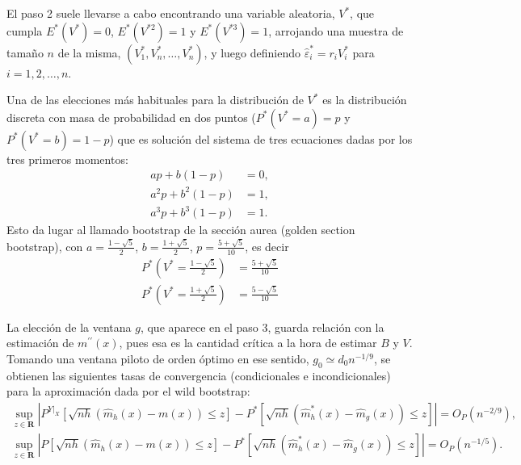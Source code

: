 \documentclass[
]{book}
\theoremstyle{break}
\theoremstyle{definition}
\theoremstyle{definition}
\theoremstyle{definition}
\theoremstyle{remark}
\begin{document}
El paso 2 suele llevarse a cabo encontrando una variable aleatoria,
\(V^{\ast}\), que cumpla \(E^{\ast}\left( V^{\ast} \right) =0\), \(E^{\ast}\left( V^{\ast 2} \right) =1\) y \(E^{\ast}\left( V^{\ast 3} \right) =1\),
arrojando una muestra de tamaño \(n\) de la misma,
\(\left( V_1^{\ast},V_n^{\ast},\ldots ,V_n^{\ast} \right)\), y luego
definiendo \(\hat{\varepsilon}_i^{\ast} = r_iV_i^{\ast}\)
para \(i=1, 2, \ldots, n\).

Una de las elecciones más habituales para la distribución de
\(V^{\ast}\) es la distribución discreta con masa de probabilidad en dos
puntos (\(P^{\ast}\left( V^{\ast}=a \right) =p\) y
\(P^{\ast}\left( V^{\ast}=b \right) =1-p\)) que es solución del sistema
de tres ecuaciones dadas por los tres primeros momentos:
\[\begin{aligned}
ap+b\left( 1-p \right) &= 0, \\
a^2p+b^2\left( 1-p \right) &= 1, \\
a^{3}p+b^{3}\left( 1-p \right) &= 1.
\end{aligned}\]
Esto da lugar al llamado bootstrap de la sección aurea
(golden section bootstrap), con
\(a=\frac{1-\sqrt{5}}{2}\), \(b=\frac{1+\sqrt{5}}{2}\), \(p=\frac{ 5+\sqrt{5}}{10}\), es decir
\[\begin{aligned}
P^{\ast}\left( V^{\ast}=\frac{1-\sqrt{5}}{2} \right) &= \frac{5+\sqrt{5}}{10} \\
P^{\ast}\left( V^{\ast}=\frac{1+\sqrt{5}}{2} \right) &= \frac{5-\sqrt{5}}{10}
\end{aligned}\]

La elección de la ventana \(g\), que aparece en el paso 3, guarda relación
con la estimación de \(m^{\prime \prime }\left( x \right)\), pues esa es
la cantidad crítica a la hora de estimar \(B\) y \(V\). Tomando una ventana
piloto de orden óptimo en ese sentido, \(g_{0}\simeq d_{0}n^{-1/9}\),
se obtienen las siguientes tasas de convergencia (condicionales e
incondicionales) para la aproximación dada por el wild bootstrap:
\[\begin{gathered}
\sup_{z\in \boldsymbol{R}} \left\vert P^{\left. Y\right\vert _{X}}\left[ 
\sqrt{nh}\left( \hat{m}_{h}\left( x \right) -m\left( x \right) \right) \leq z
\right] - P^{\ast}\left[ \sqrt{nh}\left( \hat{m}_{h}^{\ast}\left( x \right) -
\hat{m}_{g}\left( x \right) \right) \leq z\right] \right\vert = O_{P}\left( n^{-2/9} \right), 
\\
\sup_{z\in \boldsymbol{R}} \left\vert P\left[ \sqrt{nh}\left( \hat{m}
_{h}\left( x \right) -m\left( x \right) \right) \leq z\right] 
 - P^{\ast}\left[ \sqrt{nh}\left( \hat{m}_{h}^{\ast}\left( x \right) -\hat{m}_{g}\left(
x \right) \right) \leq z\right] \right\vert = O_{P}\left( n^{-1/5} \right).
\end{gathered}\]
\end{document}
